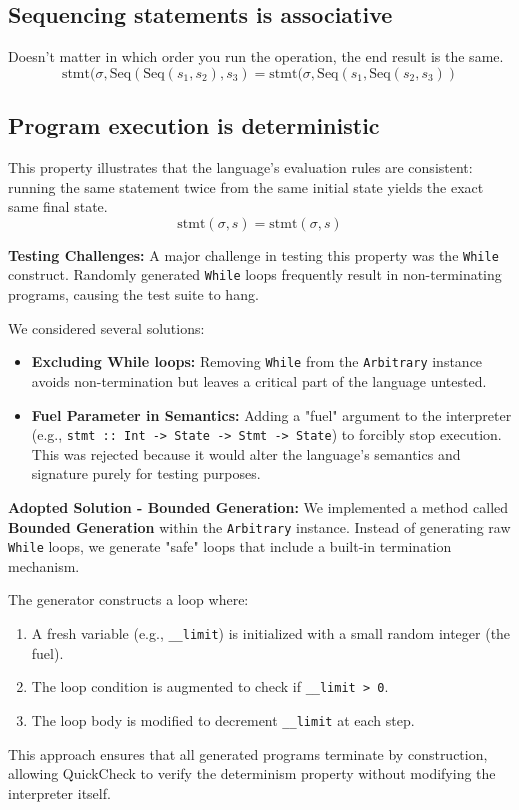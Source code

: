 \documentclass{article}
\begin{document}
	\subsection{Sequencing statements is associative}
	Doesn't matter in which order you run the operation, the end result is the same.
	\[
	\text{stmt}(\sigma, \text{Seq}(\text{Seq}(s_1, s_2), s_3) = \text{stmt}(\sigma, \text{Seq}(s_1, \text{Seq}(s_2, s_3))
	\]
	\subsection{Program execution is deterministic}
	This property illustrates that the language's evaluation rules are consistent: running the same statement twice from the same initial state yields the exact same final state.
	\[
	\text{stmt}(\sigma, s) = \text{stmt}(\sigma, s)
	\]
	
	\textbf{Testing Challenges:}
	A major challenge in testing this property was the \texttt{While} construct. Randomly generated \texttt{While} loops frequently result in non-terminating programs, causing the test suite to hang.
	
	We considered several solutions:
	\begin{itemize}
		\item \textbf{Excluding While loops:} Removing \texttt{While} from the \texttt{Arbitrary} instance avoids non-termination but leaves a critical part of the language untested.
		\item \textbf{Fuel Parameter in Semantics:} Adding a "fuel" argument to the interpreter (e.g., \texttt{stmt :: Int -> State -> Stmt -> State}) to forcibly stop execution. This was rejected because it would alter the language's semantics and signature purely for testing purposes.
	\end{itemize}
	
	\textbf{Adopted Solution - Bounded Generation:}
	We implemented a method called \textbf{Bounded Generation} within the \texttt{Arbitrary} instance. Instead of generating raw \texttt{While} loops, we generate "safe" loops that include a built-in termination mechanism. 
	
	The generator constructs a loop where:
	\begin{enumerate}
		\item A fresh variable (e.g., \texttt{\_\_limit}) is initialized with a small random integer (the fuel).
		\item The loop condition is augmented to check if \texttt{\_\_limit > 0}.
		\item The loop body is modified to decrement \texttt{\_\_limit} at each step.
	\end{enumerate}
	This approach ensures that all generated programs terminate by construction, allowing QuickCheck to verify the determinism property without modifying the interpreter itself.
\end{document}
